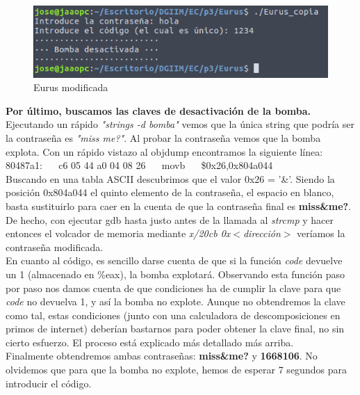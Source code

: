 \documentclass[11pt,a4paper]{article}
\begin{document}
\begin{figure}[H] 
	\centering
	\includegraphics[scale=0.45]{capturas/Eurus2.png} 
	\caption{Eurus modificada} \label{fig:figura25}
\end{figure}

\textbf{Por último, buscamos las claves de desactivación de la bomba.} Ejecutando un rápido \emph{"strings -d bomba"} vemos que la única string que podría ser la contraseña es \emph{"miss me?"}. Al probar la contraseña vemos que la bomba explota. Con un rápido vistazo al objdump encontramos la siguiente línea: \\

 80487a1: $\quad$ c6 05 44 a0 04 08 26 $\quad$ movb $\quad$ \$0x26,0x804a044 \\

Buscando en una tabla 	ASCII descubrimos que el valor 0x26 = '\&'. Siendo la posición 0x804a044 el quinto elemento de la contraseña, el espacio en blanco, basta sustituirlo para caer en la cuenta de que la contraseña final es \textbf{miss\&me?}. \\

De hecho, con ejecutar gdb hasta justo antes de la llamada al \emph{strcmp} y hacer entonces el volcador de memoria mediante \emph{x/20cb 0x$<$dirección$>$} veríamos la contraseña modificada. \\

En cuanto al código, es sencillo darse cuenta de que si la función \emph{code} devuelve un 1 (almacenado en \%eax), la bomba explotará. Observando esta función paso por paso nos damos cuenta de que condiciones ha de cumplir la clave para que \emph{code} no devuelva 1, y así la bomba no explote. Aunque no obtendremos la clave como tal, estas condiciones (junto con una calculadora de descomposiciones en primos de internet) deberían bastarnos para poder obtener la clave final, no sin cierto esfuerzo. El proceso está explicado más detallado más arriba. \\

Finalmente obtendremos ambas contraseñas: \textbf{miss\&me?} y \textbf{1668106}. No olvidemos que para que la bomba no explote, hemos de esperar 7 segundos para introducir el código. \\   
\end{document}
